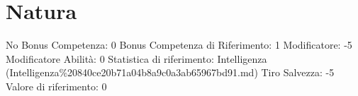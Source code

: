 \section{Natura}\label{natura}

\begin{description}
\tightlist
\item[Tags: ABI]
No Bonus Competenza: 0 Bonus Competenza di Riferimento: 1 Modificatore:
-5 Modificatore Abilità: 0 Statistica di riferimento: Intelligenza
(Intelligenza\%20840ce20b71a04b8a9c0a3ab65967bd91.md) Tiro Salvezza: -5
Valore di riferimento: 0
\end{description}
